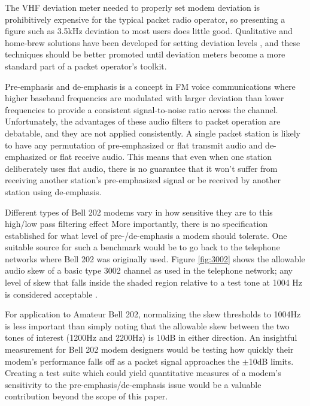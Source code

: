 The VHF deviation meter needed to properly set modem deviation is prohibitively
expensive for the typical packet radio operator, so presenting a figure 
such as 3.5kHz deviation to most users does little good.
Qualitative and home-brew solutions have been developed
for setting deviation levels \cite{n8urdev},
and these techniques should be better promoted until 
deviation meters become a more standard part of a packet operator's toolkit. 

Pre-emphasis and de-emphasis is a concept in FM voice communications where
higher baseband frequencies are modulated with larger deviation 
than lower frequencies
to provide a consistent signal-to-noise ratio across the channel.
Unfortunately, the advantages of these audio filters to packet operation 
are debatable, and they are not applied consistently. A single packet 
station is likely to have any permutation of pre-emphasized or flat 
transmit audio and de-emphasized or flat receive audio.
This means that even when one station deliberately uses flat audio,
there is no guarantee that it won't suffer from receiving another
station's pre-emphasized signal or be received by another station using de-emphasis.

Different types of Bell 202 modems vary in how sensitive they are to this high/low
pass filtering effect More importantly, there is no specification established
for what level of pre-/de-emphasis a modem should tolerate.
One suitable source for such a benchmark would be to go back to the
telephone networks where Bell 202 was originally used.
Figure \ref{fig:3002} shows the allowable audio skew of a basic type 3002
channel as used in the telephone network; any level of skew that falls 
inside the shaded region relative to a test tone at 1004 Hz is considered 
acceptable \cite{alisouskas}.

For application to Amateur Bell 202, 
normalizing the skew thresholds to 1004Hz is 
less important than simply noting that the allowable skew between the two
tones of interest (1200Hz and 2200Hz) is 10dB in either direction.
An insightful measurement for Bell 202 modem designers would be testing how
quickly their modem's performance falls off as a packet signal approaches 
the $\pm$10dB limits.
Creating a test suite which could yield quantitative
measures of a modem's sensitivity to the pre-emphasis/de-emphasis issue would
be a valuable contribution beyond the scope of this paper.

